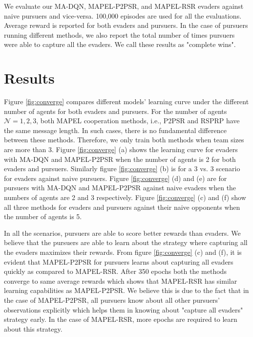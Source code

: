 \documentclass[conference]{IEEEtran}
\begin{document}
We evaluate our MA-DQN, MAPEL-P2PSR, and MAPEL-RSR evaders against naive pursuers and vice-versa. 100,000 episodes are used for all the evaluations. Average reward is reported for both evaders and pursuers. In the case of pursuers running different methods, we also report the total number of times pursuers were able to capture all the evaders. We call these results as "complete wins".



\section{Results}

Figure \ref{fig:converge} compares different models' learning curve under the different number of agents for both evaders and pursuers. For the number of agents $\mathcal{N}={1,2,3}$, both MAPEL cooperation methods, i.e., P2PSR and RSPRP have the same message length. In such cases, there is no fundamental difference between these methods. Therefore, we only train both methods when team sizes are more than 3. Figure \ref{fig:converge} (a) shows the learning curve for evaders with MA-DQN and MAPEL-P2PSR when the number of agents is 2 for both evaders and pursuers. Similarly figure \ref{fig:converge} (b) is for a 3 vs. 3 scenario for evaders against naive pursuers. Figure \ref{fig:converge} (d) and (e) are for pursuers with MA-DQN and MAPEL-P2PSR against naive evaders when the numbers of agents are 2 and 3 respectively. Figure \ref{fig:converge} (c) and (f) show all three methods for evaders and pursuers against their naive opponents when the number of agents is 5.

In all the scenarios, pursuers are able to score better rewards than evaders. We believe that the pursuers are able to learn about the strategy where capturing all the evaders maximizes their rewards. From figure \ref{fig:converge} (c) and (f), it is evident that MAPEL-P2PSR for pursuers learns about capturing all evaders quickly as compared to MAPEL-RSR. After 350 epochs both the methods converge to same average rewards which shows that MAPEL-RSR has similar learning capabilities as MAPEL-P2PSR. We believe this is due to the fact that in the case of MAPEL-P2PSR, all pursuers know about all other pursuers' observations explicitly which helps them in knowing about "capture all evaders" strategy early. In the case of MAPEL-RSR, more epochs are required to learn about this strategy.
\end{document}
